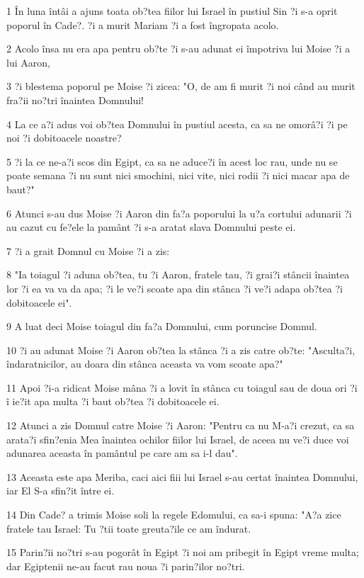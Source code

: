 \par 1 În luna întâi a ajuns toata ob?tea fiilor lui Israel în pustiul Sin ?i s-a oprit poporul în Cade?. ?i a murit Mariam ?i a fost îngropata acolo.
\par 2 Acolo însa nu era apa pentru ob?te ?i s-au adunat ei împotriva lui Moise ?i a lui Aaron,
\par 3 ?i blestema poporul pe Moise ?i zicea: "O, de am fi murit ?i noi când au murit fra?ii no?tri înaintea Domnului!
\par 4 La ce a?i adus voi ob?tea Domnului în pustiul acesta, ca sa ne omorâ?i ?i pe noi ?i dobitoacele noastre?
\par 5 ?i la ce ne-a?i scos din Egipt, ca sa ne aduce?i în acest loc rau, unde nu se poate semana ?i nu sunt nici smochini, nici vite, nici rodii ?i nici macar apa de baut?"
\par 6 Atunci s-au dus Moise ?i Aaron din fa?a poporului la u?a cortului adunarii ?i au cazut cu fe?ele la pamânt ?i s-a aratat slava Domnului peste ei.
\par 7 ?i a grait Domnul cu Moise ?i a zis:
\par 8 "Ia toiagul ?i aduna ob?tea, tu ?i Aaron, fratele tau, ?i grai?i stâncii înaintea lor ?i ea va va da apa; ?i le ve?i scoate apa din stânca ?i ve?i adapa ob?tea ?i dobitoacele ei".
\par 9 A luat deci Moise toiagul din fa?a Domnului, cum poruncise Domnul.
\par 10 ?i au adunat Moise ?i Aaron ob?tea la stânca ?i a zis catre ob?te: "Asculta?i, îndaratnicilor, au doara din stânca aceasta va vom scoate apa?"
\par 11 Apoi ?i-a ridicat Moise mâna ?i a lovit în stânca cu toiagul sau de doua ori ?i î ie?it apa multa ?i baut ob?tea ?i dobitoacele ei.
\par 12 Atunci a zis Domnul catre Moise ?i Aaron: "Pentru ca nu M-a?i crezut, ca sa arata?i sfin?enia Mea înaintea ochilor fiilor lui Israel, de aceea nu ve?i duce voi adunarea aceasta în pamântul pe care am sa i-l dau".
\par 13 Aceasta este apa Meriba, caci aici fiii lui Israel s-au certat înaintea Domnului, iar El S-a sfin?it între ei.
\par 14 Din Cade? a trimis Moise soli la regele Edomului, ca sa-i spuna: "A?a zice fratele tau Israel: Tu ?tii toate greuta?ile ce am îndurat.
\par 15 Parin?ii no?tri s-au pogorât în Egipt ?i noi am pribegit în Egipt vreme multa; dar Egiptenii ne-au facut rau noua ?i parin?ilor no?tri.
